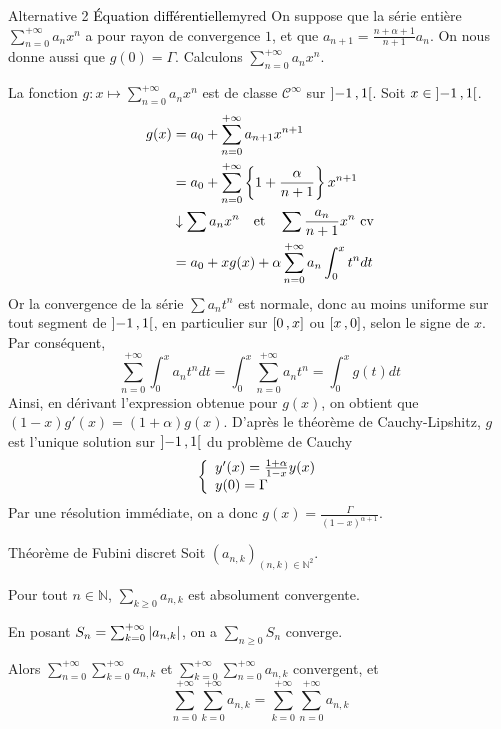    \begin{omed}{Alternative 2 \textcolor{black}{Équation différentielle}}{myred}
        On suppose que la série entière $\sum_{n=0}^{+\infty} a_n x^n$ a pour rayon de convergence $1$, et que $a_{n+1} = \frac{n+\alpha + 1}{n+1} a_n$. On nous donne aussi que $g(0) = \Gamma$. Calculons $\sum_{n = 0}^{+\infty} a_n x^n$.

        La fonction $g : x \mapsto \sum_{n=0}^{+\infty} a_n x^n$ est de classe $\mathcal{C}^{\infty}$ sur $\left] -1 \, , 1 \right[$. Soit $x \in \left] -1 \, , 1 \right[$.
        \begin{align*}
            g(x)
            &= a_0 + \sum_{n=0}^{+\infty} a_{n+1} x^{n+1} \\
            &= a_0 + \sum_{n=0}^{+\infty} \left\{1 + \frac{\alpha}{n+1}\right\} x^{n+1} \\
            & \downarrow \sum a_n x^n \quad \text{et} \quad \sum \frac{a_n}{n+1} x^n \text{ cv} \\
            &= a_0 + x g(x) + \alpha \sum_{n=0}^{+\infty} a_n \int_{0}^{x} t^n dt 
        \end{align*}
        Or la convergence de la série $\sum a_n t^n$ est normale, donc au moins uniforme sur tout segment de $\left] -1 \, , 1 \right[$, en particulier sur $\left[ 0 \, , x \right]$ ou $\left[ x \, , 0 \right]$, selon le signe de $x$. Par conséquent, 
        \[ \sum_{n=0}^{+\infty} \int_{0}^{x} a_n t^n dt = \int_{0}^{x} \sum_{n=0}^{+\infty} a_n t^n = \int_{0}^{x} g(t)dt \]   
        Ainsi, en dérivant l’expression obtenue pour $g(x)$, on obtient que $(1 - x)g'(x) = (1 + \alpha) g(x)$. D’après le théorème de Cauchy-Lipshitz, $g$ est l’unique solution sur $\left] -1 \, , 1 \right[$ du problème de Cauchy 
        \[ \et{y'(x) = \frac{1+ \alpha}{1 - x} y(x)}{y(0) = \Gamma} \]    
        Par une résolution immédiate, on a donc $g(x) = \frac{\Gamma}{(1-x)^{\alpha + 1}}$.
    \end{omed}

    \begin{theo}{Théorème de Fubini discret}{}
        Soit $(a_{n,k})_{(n,k) \in \mathbb{N}^2}$.
        \begin{suppose}
            \item Pour tout $n \in \mathbb{N}$, $\sum_{k \geq 0} a_{n,k}$ est absolument convergente.
            \item En posant $S_n = \sum_{k=0}^{+\infty} \left\lvert a_{n,k}\right\rvert$, on a $\sum_{n \geq 0} S_n$ converge.
        \end{suppose}
        Alors 
        $\sum_{n=0}^{+\infty} \sum_{k=0}^{+\infty} a_{n,k}$ et $\sum_{k=0}^{+\infty} \sum_{n=0}^{+\infty} a_{n,k}$ convergent, et 
        \[ \sum_{n=0}^{+\infty} \sum_{k=0}^{+\infty} a_{n,k} = \sum_{k=0}^{+\infty} \sum_{n=0}^{+\infty} a_{n,k} \]
    \end{theo}

